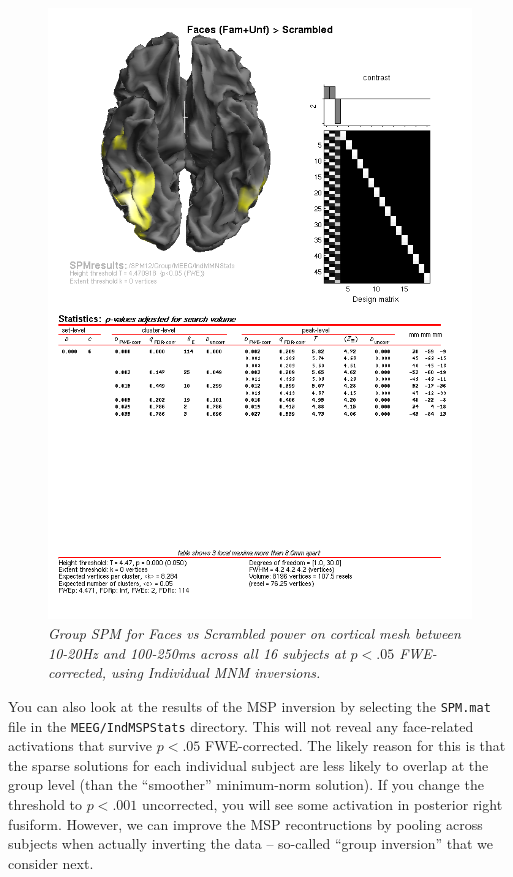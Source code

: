 \begin{figure}
\begin{center}
\includegraphics[width=150mm]{multi/figures/figure14}
\caption{\em Group SPM for Faces vs Scrambled power on cortical mesh between 10-20Hz and 100-250ms  across all 16 subjects at \(p<.05\) FWE-corrected, using Individual MNM inversions. \label{multi:fig:14}}
\end{center}
\end{figure}

You can also look at the results of the MSP inversion by selecting the \texttt{SPM.mat} file in the \texttt{MEEG/IndMSPStats} directory. This will not reveal any face-related activations that survive \(p<.05\) FWE-corrected. The likely reason for this is that the sparse solutions for each individual subject are less likely to overlap at the group level (than the ``smoother'' minimum-norm solution). If you change the threshold to \(p<.001\) uncorrected, you will see some activation in posterior right fusiform. However, we can improve the MSP recontructions by pooling across subjects when actually inverting the data -- so-called ``group inversion'' that we consider next.

